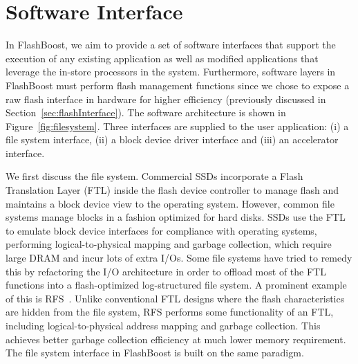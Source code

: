 \section{Software Interface}
\label{sec:software}

In FlashBoost, we aim to provide a set of software interfaces that support the
execution of any existing application as well as modified applications that
leverage the in-store processors in the system. Furthermore, software layers in
FlashBoost must perform flash management functions since we chose to expose a
raw flash interface in hardware for higher efficiency (previously discussed in
Section~\ref{sec:flashInterface}). The software architecture is shown in
Figure~\ref{fig:filesystem}.  Three interfaces are supplied to the user
application: (i) a file system interface, (ii) a block device driver interface
and (iii) an accelerator interface. 


We first discuss the file system. Commercial SSDs incorporate a Flash
Translation Layer (FTL) inside the flash device controller to manage flash and
maintains a block device view to the operating system.  However, common file
systems manage blocks in a fashion optimized for hard disks.  SSDs use
the FTL to emulate block device interfaces for compliance with operating systems, performing
logical-to-physical mapping and garbage collection, which require large DRAM
and incur lots of extra I/Os. Some file systems have tried to remedy this by
refactoring the I/O architecture in order to offload most of the FTL functions
into a flash-optimized log-structured file system. A prominent example of this
is RFS~\cite{rfs}.  Unlike conventional FTL designs where the flash
characteristics are hidden from the file system, RFS performs some
functionality of an FTL, including logical-to-physical address mapping and
garbage collection.  This achieves better garbage collection efficiency at much
lower memory requirement. The file system interface in FlashBoost is built on
the same paradigm. 

